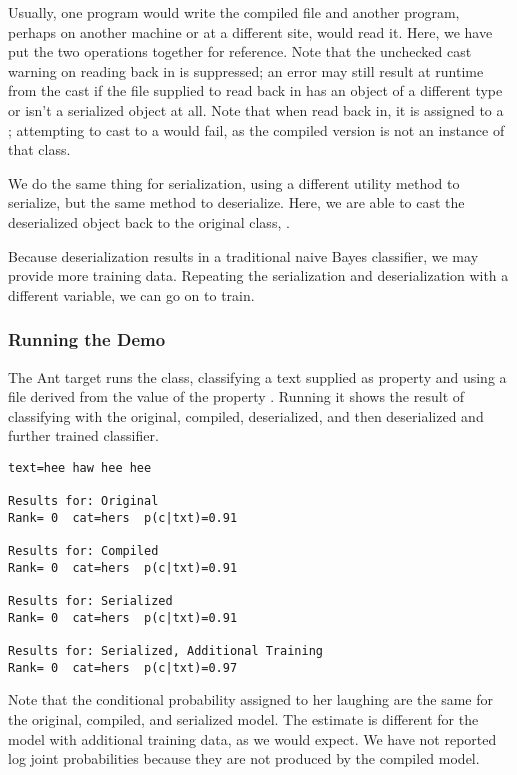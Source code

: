 Usually, one program would write the compiled file and another
program, perhaps on another machine or at a different site, would read
it.  Here, we have put the two operations together for reference.
Note that the unchecked cast warning on reading back in is suppressed;
an error may still result at runtime from the cast if the file
supplied to read back in has an object of a different type or isn't a
serialized object at all. Note that when read back in, it is
assigned to a ; attempting to
cast to a  would fail, as the compiled
version is not an instance of that class.

We do the same thing for serialization, using a different utility method
to serialize, but the same  method to deserialize. 
%
%
Here, we are able to cast the deserialized object back to the original
class, .  

Because deserialization results in a traditional naive Bayes
classifier, we may provide more training data.  Repeating the
serialization and deserialization with a different variable,
we can go on to train.
%



\subsubsection{Running the Demo}

The Ant target  runs the class, classifying
a text supplied as property  and using a file derived
from the value of the property .  Running it shows
the result of classifying with the original, compiled, deserialized,
and then deserialized and further trained classifier.

\begin{verbatim}
text=hee haw hee hee

Results for: Original
Rank= 0  cat=hers  p(c|txt)=0.91

Results for: Compiled
Rank= 0  cat=hers  p(c|txt)=0.91

Results for: Serialized
Rank= 0  cat=hers  p(c|txt)=0.91

Results for: Serialized, Additional Training
Rank= 0  cat=hers  p(c|txt)=0.97
\end{verbatim}

Note that the conditional probability assigned to her laughing are the
same for the original, compiled, and serialized model.  The estimate
is different for the model with additional training data, as we
would expect.  We have not reported log joint probabilities because
they are not produced by the compiled model.


